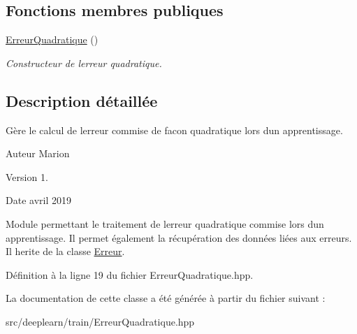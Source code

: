 \subsection*{Fonctions membres publiques}
\begin{DoxyCompactItemize}
\item 
\mbox{\label{class_erreur_quadratique_aa11b896dc5e7ed5427568ee2c0bc1b1a}} 
\hyperlink{class_erreur_quadratique_aa11b896dc5e7ed5427568ee2c0bc1b1a}{Erreur\+Quadratique} ()
\begin{DoxyCompactList}\small\item\em Constructeur de l\textquotesingle{}erreur quadratique. \end{DoxyCompactList}\end{DoxyCompactItemize}


\subsection{Description détaillée}
Gère le calcul de l\textquotesingle{}erreur commise de facon quadratique lors d\textquotesingle{}un apprentissage. 

\begin{DoxyAuthor}{Auteur}
Marion 
\end{DoxyAuthor}
\begin{DoxyVersion}{Version}
1. 
\end{DoxyVersion}
\begin{DoxyDate}{Date}
avril 2019
\end{DoxyDate}
Module permettant le traitement de l\textquotesingle{}erreur quadratique commise lors d\textquotesingle{}un apprentissage. Il permet également la récupération des données liées aux erreurs. Il herite de la classe \hyperlink{class_erreur}{Erreur}. 

Définition à la ligne 19 du fichier Erreur\+Quadratique.\+hpp.



La documentation de cette classe a été générée à partir du fichier suivant \+:\begin{DoxyCompactItemize}
\item 
src/deeplearn/train/Erreur\+Quadratique.\+hpp\end{DoxyCompactItemize}
